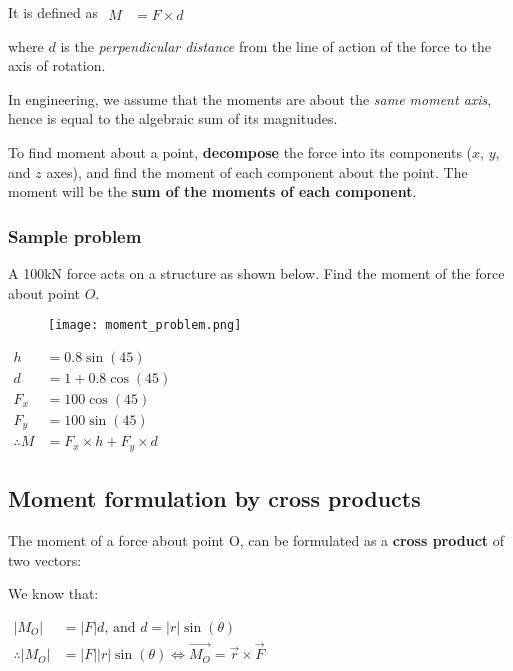 \documentclass{scrartcl}
\begin{document}
It is defined as 
\begin{math}
    \begin{aligned}
        M &= F \times d
    \end{aligned}
\end{math}

where \(d\) is the \emph{perpendicular distance} from the 
line of action of the force to the axis of rotation.

In engineering, we assume that the moments are about the \emph{same moment axis}, hence is equal to the algebraic sum of its magnitudes.

To find moment about a point, \textbf{decompose} the force into its components (\(x\), \(y\), and \(z\) axes), 
and find the moment of each component about the point.
The moment will be the \textbf{sum of the moments of each component}.

\subsubsection{Sample problem}

A 100\unit{\kilo\newton} force acts on a structure as shown below. Find the moment of the force about point \(O\).

\begin{figure}[h]
    \centering
    \texttt{[image: moment\_problem.png]}
\end{figure}

\begin{math}
    \begin{aligned}
        h &= 0.8 \sin(45) \\
        d &= 1 + 0.8 \cos(45) \\
        F_x &= 100 \cos(45) \\ 
        F_y &= 100 \sin(45) \\
        \therefore{} M &= F_x \times h + F_y \times d
    \end{aligned}
\end{math}

\subsection{Moment formulation by cross products}
The moment of a force about point O, can be formulated as a \textbf{cross product} of two vectors:

We know that:

\begin{math}
    \begin{aligned}
        |M_O| &= |F|d \text{, and } d = |r| \sin(\theta) \\
        \therefore |M_O| &= |F||r| \sin(\theta) \iff \vec{M_O} = \vec{r} \times \vec{F}
    \end{aligned}
\end{math}
\end{document}
